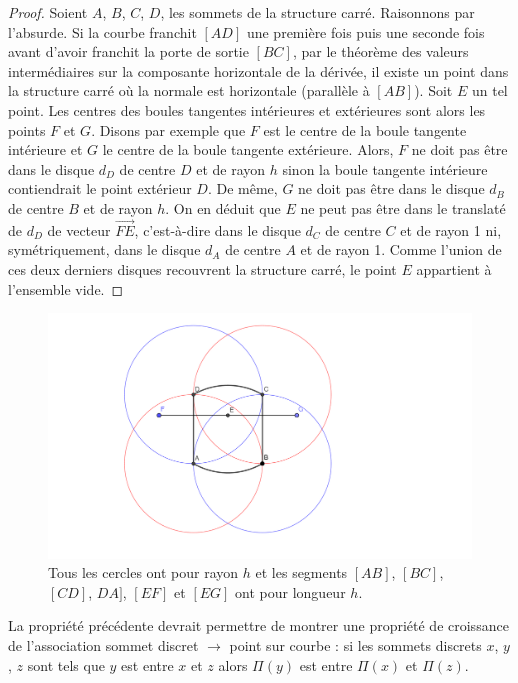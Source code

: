 \documentclass{report}
\begin{document}
    \begin{proof}
      Soient $A$, $B$, $C$, $D$, les sommets de la structure carré. Raisonnons par l'absurde. Si la courbe franchit $[AD]$ une première fois puis une seconde fois avant d'avoir franchit la \og porte de sortie\fg{} $[BC]$, par le théorème des valeurs intermédiaires sur la composante horizontale de la dérivée, il existe un point dans la structure carré où la normale est horizontale (parallèle à $[AB]$).
      Soit $E$ un tel point. Les centres des boules tangentes intérieures et extérieures sont alors les points $F$ et $G$. Disons par exemple que $F$ est le centre de la boule tangente intérieure et $G$ le centre de la boule tangente extérieure. Alors, $F$ ne doit pas être dans le disque $d_D$ de centre $D$ et de rayon $h$ sinon la boule tangente intérieure contiendrait le point extérieur $D$. De même, $G$ ne doit pas être dans le disque $d_B$ de centre $B$ et de rayon $h$.
      On en déduit que $E$ ne peut pas être dans le translaté de $d_D$ de vecteur $\vec {FE}$, c'est-à-dire dans le disque $d_C$ de centre $C$ et de rayon 1 ni, symétriquement, dans le disque $d_A$ de centre $A$ et de rayon 1. Comme l'union de ces deux derniers disques recouvrent la structure carré, le point $E$ appartient à l'ensemble vide.
    \end{proof}
    
    \begin{figure}[!h]
      \centering
\includegraphics[width=12cm]{normale_horiz.pdf}
\caption{\label{fig:normale_horiz}Tous les cercles ont pour rayon $h$ et les segments $[AB]$, $[BC]$, $[CD]$, $DA]$, $[EF]$ et $[EG]$ ont pour longueur $h$.}
\end{figure}

La propriété précédente devrait permettre de montrer une propriété de croissance de l'association sommet discret $\to$ point sur courbe : si les sommets discrets $x$, $y$, $z$ sont tels que $y$ est entre $x$ et $z$ alors $\Pi(y)$ est entre $\Pi(x)$ et $\Pi(z)$.
\end{document}
